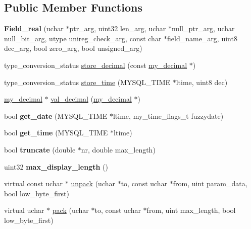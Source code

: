 \subsection*{Public Member Functions}
\begin{DoxyCompactItemize}
\item 
\mbox{\label{classField__real_a0d237f324ea333dbcbf98154911b34c0}} 
{\bfseries Field\+\_\+real} (uchar $\ast$ptr\+\_\+arg, uint32 len\+\_\+arg, uchar $\ast$null\+\_\+ptr\+\_\+arg, uchar null\+\_\+bit\+\_\+arg, utype unireg\+\_\+check\+\_\+arg, const char $\ast$field\+\_\+name\+\_\+arg, uint8 dec\+\_\+arg, bool zero\+\_\+arg, bool unsigned\+\_\+arg)
\item 
type\+\_\+conversion\+\_\+status \mbox{\hyperlink{classField__real_ae06ebf885e6b10b0a7c4966873d6b80f}{store\+\_\+decimal}} (const \mbox{\hyperlink{classmy__decimal}{my\+\_\+decimal}} $\ast$)
\item 
type\+\_\+conversion\+\_\+status \mbox{\hyperlink{classField__real_a2020c5eabc8cdc2c451ca0591e284150}{store\+\_\+time}} (M\+Y\+S\+Q\+L\+\_\+\+T\+I\+ME $\ast$ltime, uint8 dec)
\item 
\mbox{\hyperlink{classmy__decimal}{my\+\_\+decimal}} $\ast$ \mbox{\hyperlink{classField__real_aea0b139caebcb6dc909b1bc397f5aba6}{val\+\_\+decimal}} (\mbox{\hyperlink{classmy__decimal}{my\+\_\+decimal}} $\ast$)
\item 
\mbox{\label{classField__real_a45eda52e25c73ee372b039045d035f50}} 
bool {\bfseries get\+\_\+date} (M\+Y\+S\+Q\+L\+\_\+\+T\+I\+ME $\ast$ltime, my\+\_\+time\+\_\+flags\+\_\+t fuzzydate)
\item 
\mbox{\label{classField__real_ad3dcc83a9dfe6516d83bd3d80faaf30c}} 
bool {\bfseries get\+\_\+time} (M\+Y\+S\+Q\+L\+\_\+\+T\+I\+ME $\ast$ltime)
\item 
\mbox{\label{classField__real_af9694b9e50dbb08b625e3884a525af95}} 
bool {\bfseries truncate} (double $\ast$nr, double max\+\_\+length)
\item 
\mbox{\label{classField__real_a858dae45995bdd890176c92dbddc0c2e}} 
uint32 {\bfseries max\+\_\+display\+\_\+length} ()
\item 
virtual const uchar $\ast$ \mbox{\hyperlink{classField__real_aab922b4da48c1fd508344b1f627e0e0e}{unpack}} (uchar $\ast$to, const uchar $\ast$from, uint param\+\_\+data, bool low\+\_\+byte\+\_\+first)
\item 
virtual uchar $\ast$ \mbox{\hyperlink{classField__real_a350715a27630782dd1247287d2446480}{pack}} (uchar $\ast$to, const uchar $\ast$from, uint max\+\_\+length, bool low\+\_\+byte\+\_\+first)
\end{DoxyCompactItemize}
